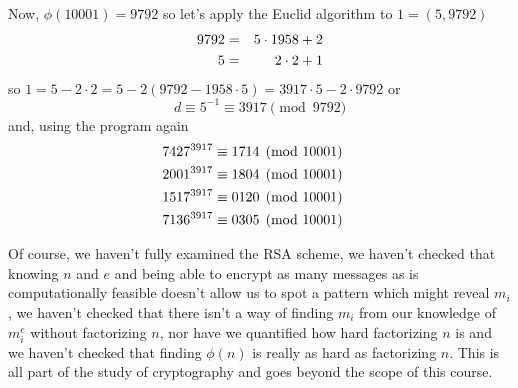 \documentclass[12pt]{article}
\begin{document}
Now, $\phi(10001)=9792$ so let's apply the Euclid algorithm to $1=(5,9792)$
\begin{eqnarray}
9792&=&5\cdot 1958+2\cr
5&=&2\cdot 2+1
\end{eqnarray}
so $1=5-2\cdot 2=5-2(9792-1958\cdot 5)=3917\cdot 5-2\cdot 9792$ or
\begin{equation}
d\equiv 5^{-1}\equiv 3917 \pmod {9792}
\end{equation}
and, using the program again
\begin{eqnarray}
7427^{3917}&\equiv 1714 \pmod{10001}\cr
2001^{3917}&\equiv 1804 \pmod{10001}\cr
1517^{3917}&\equiv 0120 \pmod{10001}\cr
7136^{3917}&\equiv 0305 \pmod{10001}
\end{eqnarray}

Of course, we haven't fully examined the RSA scheme, we haven't
checked that knowing $n$ and $e$ and being able to encrypt as many
messages as is computationally feasible doesn't allow us to spot a
pattern which might reveal $m_i$, we haven't checked that there isn't a
way of finding $m_i$ from our knowledge of $m_i^e$ without factorizing
$n$, nor have we quantified how hard factorizing $n$ is and we haven't
checked that finding $\phi(n)$ is really as hard as factorizing
$n$. This is all part of the study of cryptography and goes beyond the
scope of this course.
\end{document}

